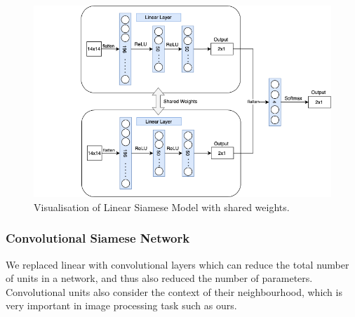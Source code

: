 \documentclass[10pt,conference,compsocconf]{IEEEtran}
\begin{document}
\begin{figure}[htbp]
  \centering
  \includegraphics[width=\columnwidth]{doc/project1-report/linear_siamese.png}
  \vspace{-3mm}
  \caption{Visualisation of Linear Siamese Model with shared weights.}
  \label{fig:siamese2}
\end{figure}


\subsubsection{Convolutional Siamese Network}\label{subsubsec:convolutional-networks}
We replaced linear with convolutional layers which can reduce the total number of units in a network, and thus also reduced the number of parameters. Convolutional units also consider the context of their neighbourhood, which is very important in image processing task such as ours. \newline
\end{document}
